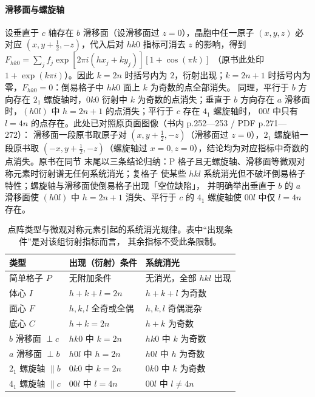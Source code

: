 \paragraph{滑移面与螺旋轴}设垂直于 $c$ 轴存在 $b$ 滑移面（设滑移面过 $z=0$），晶胞中任一原子
$(x,y,z)$ 必对应 $(x,y+\tfrac12,-z)$，代入后对 $hk0$ 指标可消去 $z$ 的影响，得到
$F_{hk0}=\sum_{j}f_{j}\exp\!\left[2\pi i(hx_{j}+ky_{j})\right]\left[1+\cos(\pi k)\right]$
（原书此处印 $1+\exp(k\pi i)$）。因此 $k=2n$ 时括号内为 $2$，衍射出现；$k=2n+1$ 时括号内为
零，$F_{hk0}=0$：倒易格子中 $hk0$ 面上 $k$ 为奇数的点全部消失。
同理，平行于 $b$ 方向存在 $2_{1}$ 螺旋轴时，$0k0$ 衍射中 $k$ 为奇数的点消失；垂直于 $b$
方向存在 $a$ 滑移面时，$(h0l)$ 中 $h=2n+1$ 的点消失；平行于 $c$ 存在 $4_{1}$ 螺旋轴时，
$00l$ 中只有 $l=4n$ 的点存在。此处已对照原页面图像（书内 p.252—253 / PDF p.271—272）：
滑移面一段原书取原子对 $(x,y+\tfrac12,-z)$（滑移面过 $z=0$），$2_{1}$ 螺旋轴一段原书取
$(-x,y+\tfrac12,-z)$（螺旋轴过 $x=0,z=0$），结论均为对应指标中奇数的点消失。原书在同节
末尾以三条结论归纳：P 格子且无螺旋轴、滑移面等微观对称元素时衍射谱无任何系统消光；复格子
使某些 $hkl$ 系统消光但不破坏倒易格子特性；螺旋轴与滑移面使倒易格子出现「空位缺陷」，
并明确举出垂直于 $b$ 的 $a$ 滑移面使 $(h0l)$ 中 $h=2n+1$ 消失、平行于 $c$ 的 $4_{1}$
螺旋轴使 $00l$ 中仅 $l=4n$ 存在。

\begin{table}[tbp]
  \centering
  \caption{点阵类型与微观对称元素引起的系统消光规律。表中“出现条件”是对该组衍射指标而言，
    其余指标不受此条限制。}
  \label{tab:ch04b-extinction}
  \begin{tabular}{@{}lll@{}}
    \toprule
    类型 & 出现（衍射）条件 & 系统消光 \\
    \midrule
    简单格子 $P$ & 无附加条件 & 无消光，全部 $hkl$ 出现 \\
    体心 $I$ & $h+k+l=2n$ & $h+k+l$ 为奇数 \\
    面心 $F$ & $h,k,l$ 全奇或全偶 & $h,k,l$ 奇偶混杂 \\
    底心 $C$ & $h+k=2n$ & $h+k$ 为奇数 \\
    $b$ 滑移面 $\perp c$ & $hk0$ 中 $k=2n$ & $hk0$ 中 $k$ 为奇数 \\
    $a$ 滑移面 $\perp b$ & $h0l$ 中 $h=2n$ & $h0l$ 中 $h$ 为奇数 \\
    $2_{1}$ 螺旋轴 $\parallel b$ & $0k0$ 中 $k=2n$ & $0k0$ 中 $k$ 为奇数 \\
    $4_{1}$ 螺旋轴 $\parallel c$ & $00l$ 中 $l=4n$ & $00l$ 中 $l\neq4n$ \\
    \bottomrule
  \end{tabular}
\end{table}

